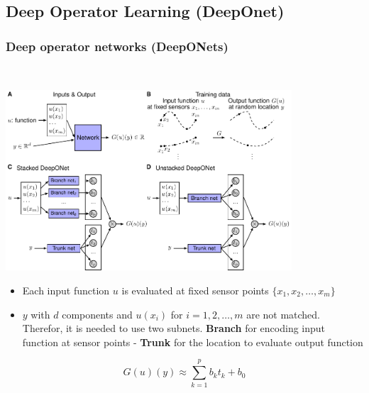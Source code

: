 \documentclass[aspectratio=169]{beamer}
\begin{document}
\subsection{Deep Operator Learning (DeepOnet)}
\begin{frame}
  \frametitle{Deep operator networks\cite{lu2021learning} (DeepONets)}\
  \centering
  \begin{minipage}{0.45\textwidth}
    \includegraphics[width=0.8\textwidth, trim={8.12cm 0cm 0cm 0cm}, clip]{deeponet.pdf}
  \end{minipage}
  \begin{minipage}{0.45\textwidth}
    \begin{itemize}
      \item Each input function $u$ is evaluated at fixed sensor points $\{x_1, x_2, \dots, x_m\}$ 
      \item $y$ with $d$ components and $u(x_i)$ for $i = {1,2, \dots, m}$ are not matched. Therefor, it is needed to use two subnets. 
      \textbf{Branch} for encoding input function at sensor points - \textbf{Trunk} for the location to evaluate output function
    \end{itemize}
  \begin{equation}
    G(u)(y) \approx \sum_{k=1}^p b_k t_k+b_0
  \end{equation}
\end{minipage}
\end{frame}
\end{document}

